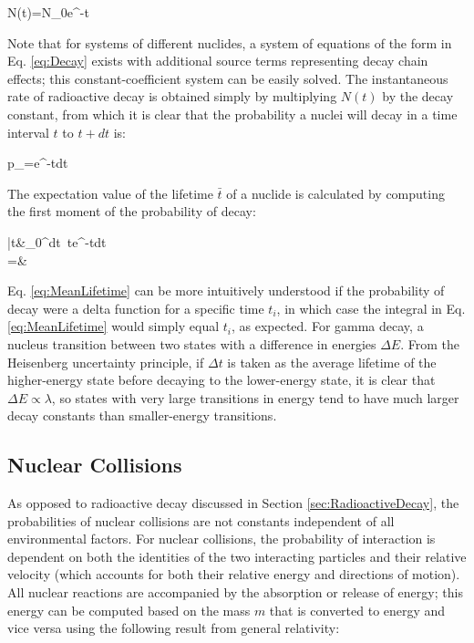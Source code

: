 \beq
\label{eq:DecayEqn}
N(t)=N_0e^{-\lambda t}
\eeq

Note that for systems of different nuclides, a system of equations of the form in Eq. \eqref{eq:Decay} exists with additional source terms representing decay chain effects; this constant-coefficient system can be easily solved. The instantaneous rate of radioactive decay is obtained simply by multiplying \(N(t)\) by the decay constant, from which it is clear that the probability a nuclei will decay in a time interval \(t\) to \(t+dt\) is:

\beq
\label{eq:ProbabilityDecay}
p_{}=\lambda e^{-\lambda t}dt
\eeq

The expectation value of the lifetime \(\bar{t}\) of a nuclide is calculated by computing the first moment of the probability of decay:

\beqa
\label{eq:MeanLifetime}
\bar{t}\equiv&\int_0^\infty dt\ t\lambda e^{-\lambda t}dt\\
=&
\eeqa

Eq. \eqref{eq:MeanLifetime} can be more intuitively understood if the probability of decay were a delta function for a specific time \(t_i\), in which case the integral in Eq. \eqref{eq:MeanLifetime} would simply equal \(t_i\), as expected. For gamma decay, a nucleus transition between two states with a difference in energies \(\Delta E\). From the Heisenberg uncertainty principle, if \(\Delta t\) is taken as the average lifetime of the higher-energy state before decaying to the lower-energy state, it is clear that \(\Delta E\propto\lambda\), so states with very large transitions in energy tend to have much larger decay constants than smaller-energy transitions.

\subsection{Nuclear Collisions}
As opposed to radioactive decay discussed in Section \ref{sec:RadioactiveDecay}, the probabilities of nuclear collisions are not constants independent of all environmental factors. For nuclear collisions, the probability of interaction is dependent on both the identities of the two interacting particles and their relative velocity (which accounts for both their relative energy and directions of motion). All nuclear reactions are accompanied by the absorption or release of energy; this energy can be computed based on the mass \(m\) that is converted to energy and vice versa using the following result from general relativity:

